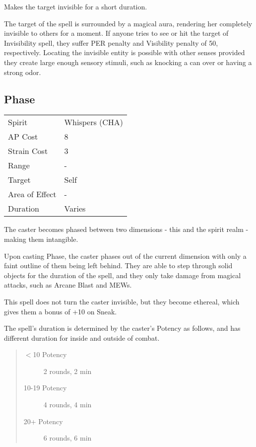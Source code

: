 \documentclass[11pt,a4paper,twocolumn]{book}
\begin{document}
\medskip

Makes the target invisible for a short duration.

The target of the spell is surrounded by a magical aura, rendering her completely invisible to others for a moment. If anyone tries to see or hit the target of Invisibility spell, they suffer PER penalty and Visibility penalty of 50, respectively. Locating the invisible entity is possible with other senses provided they create large enough sensory stimuli, such as knocking a can over or having a strong odor.



\subsection*{Phase}
{
	\begin{tabu} to 75mm{| X[l,4] | X[l,7] |}
		\hline
		Spirit         & Whispers (CHA) \\
		AP Cost        & 8                   \\
		Strain Cost    & 3                   \\
		Range          & -         \\
		Target         & Self            \\
		Area of Effect & -                   \\
		Duration       & Varies              \\ \hline
	\end{tabu}
	
}

\medskip

The caster becomes phased between two dimensions - this and the spirit realm - making them intangible.

Upon casting Phase, the caster phases out of the current dimension with only a faint outline of them being left behind. They are able to step through solid objects for the duration of the spell, and they only take damage from magical attacks, such as Arcane Blast and MEWs.

This spell does not turn the caster invisible, but they become ethereal, which gives them a bonus of +10 on Sneak.

The spell's duration is determined by the caster's Potency as follows, and has different duration for inside and outside of combat.

\begin{quote}
	\begin{description}
		\item[$<$10 Potency] 	2 rounds, 2 min
		\item[10-19 Potency] 	4 rounds, 4 min
		\item[20+ Potency] 		6 rounds, 6 min
	\end{description}	
\end{quote}
\end{document}
